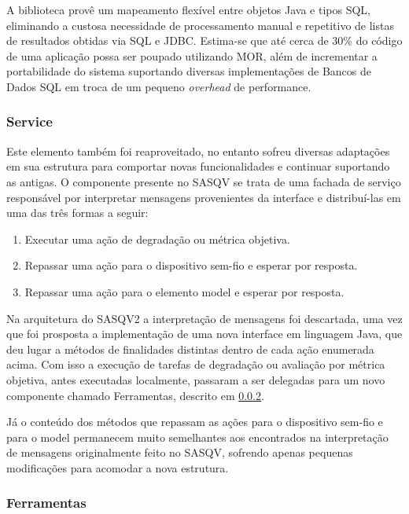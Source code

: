 A biblioteca provê um mapeamento flexível entre objetos Java e tipos SQL, eliminando a custosa necessidade de processamento manual e repetitivo de listas de resultados obtidas via SQL e JDBC.
Estima-se que até cerca de 30\% do código de uma aplicação possa ser poupado utilizando MOR, além de incrementar a portabilidade do sistema suportando diversas implementações de Bancos de Dados SQL em troca de um pequeno \emph{overhead} de performance.

\subsubsection{Service}

Este elemento também foi reaproveitado, no entanto sofreu diversas adaptações em sua estrutura para comportar novas funcionalidades e continuar suportando as antigas.
O componente presente no SASQV se trata de uma fachada de serviço responsável por interpretar mensagens provenientes da interface e distribuí-las em uma das três formas a seguir:

\begin{enumerate}
	\item Executar uma ação de degradação ou métrica objetiva.
	\item Repassar uma ação para o dispositivo sem-fio e esperar por resposta.
	\item Repassar uma ação para o elemento model e esperar por resposta.
\end{enumerate}

Na arquitetura do SASQV2 a interpretação de mensagens foi descartada, uma vez que foi prosposta a implementação de uma nova interface em linguagem Java, que deu lugar a métodos de finalidades distintas dentro de cada ação enumerada acima. %
Com isso a execução de tarefas de degradação ou avaliação por métrica objetiva, antes executadas localmente, passaram a ser delegadas para um novo componente chamado Ferramentas, descrito em \ref{met:ferramentas}.

Já o conteúdo dos métodos que repassam as ações para o dispositivo sem-fio e para o model permanecem muito semelhantes aos encontrados na interpretação de mensagens originalmente feito no SASQV, sofrendo apenas pequenas modificações para acomodar a nova estrutura.

\subsubsection{Ferramentas}
\label{met:ferramentas}

